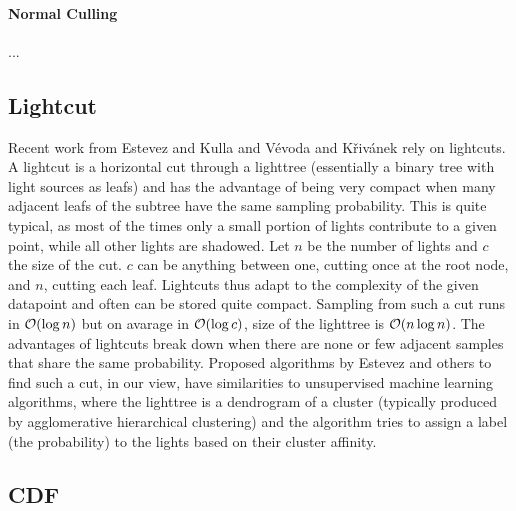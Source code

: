 \paragraph*{Normal Culling}
\label{ch:normalculling}
...

\subsection{Lightcut}

Recent work from Estevez and Kulla \cite{Estevez} and Vévoda and Křivánek \cite{Vevoda} rely on lightcuts. A lightcut is a horizontal cut through a lighttree (essentially a binary tree with light sources as leafs) and has the advantage of being very compact when many adjacent leafs of the subtree have the same sampling probability. This is quite typical, as most of the times only a small portion of lights contribute to a given point, while all other lights are shadowed. Let $n$ be the number of lights and $c$ the size of the cut. $c$ can be anything between one, cutting once at the root node, and $n$, cutting each leaf. Lightcuts thus adapt to the complexity of the given datapoint and often can be stored quite compact. Sampling from such a cut runs in $\mathcal{O}(\log{n})$ but on avarage in $\mathcal{O}(\log{c})$, size of the lighttree is $\mathcal{O}(n\log{n})$. The advantages of lightcuts break down when there are none or few adjacent samples that share the same probability. Proposed algorithms by Estevez \cite{Estevez} and others to find such a cut, in our view, have similarities to unsupervised machine learning algorithms, where the lighttree is a dendrogram of a cluster (typically produced by agglomerative hierarchical clustering) and the algorithm tries to assign a label (the probability) to the lights based on their cluster affinity. 

\subsection{CDF}

